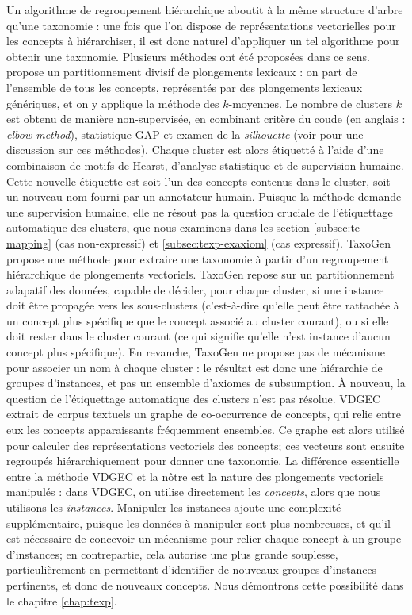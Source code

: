 Un algorithme de regroupement hiérarchique aboutit à la même structure d'arbre qu'une taxonomie : une fois que l'on dispose de représentations vectorielles pour les concepts à hiérarchiser, il est donc naturel d'appliquer un tel algorithme pour obtenir une taxonomie. Plusieurs méthodes ont été proposées dans ce sens. \cite{gupta2016domain} propose un partitionnement divisif de plongements lexicaux : on part de l'ensemble de tous les concepts, représentés par des plongements lexicaux génériques, et on y applique la méthode des $k$-moyennes. Le nombre de clusters $k$ est obtenu de manière non-supervisée, en combinant critère du coude (en anglais : \textit{elbow method}), statistique GAP et examen de la \textit{silhouette} (voir \cite[p.~126--130]{everitt2011cluster} pour une discussion sur ces méthodes). Chaque cluster est alors étiquetté à l'aide d'une combinaison de motifs de Hearst, d'analyse statistique et de supervision humaine. Cette nouvelle étiquette est soit l'un des concepts contenus dans le cluster, soit un nouveau nom fourni par un annotateur humain. Puisque la méthode demande une supervision humaine, elle ne résout pas la question cruciale de l'étiquettage automatique des clusters, que nous examinons dans les section \ref{subsec:te-mapping} (cas non-expressif) et \ref{subsec:texp-exaxiom} (cas expressif). TaxoGen \cite{zhang2018taxogen} propose une méthode pour extraire une taxonomie à partir d'un regroupement hiérarchique de plongements vectoriels. TaxoGen repose sur un partitionnement adapatif des données, capable de décider, pour chaque cluster, si une instance doit être propagée vers les sous-clusters (c'est-à-dire qu'elle peut être rattachée à un concept plus spécifique que le concept associé au cluster courant), ou si elle doit rester dans le cluster courant (ce qui signifie qu'elle n'est instance d'aucun concept plus spécifique). En revanche, TaxoGen ne propose pas de mécanisme pour associer un nom à chaque cluster : le résultat est donc une hiérarchie de groupes d'instances, et pas un ensemble d'axiomes de subsumption. À nouveau, la question de l'étiquettage automatique des clusters n'est pas résolue.
VDGEC \cite{zhang2018variational2} extrait de corpus textuels un graphe de co-occurrence de concepts, qui relie entre eux les concepts apparaissants fréquemment ensembles. Ce graphe est alors utilisé pour calculer des représentations vectoriels des concepts; ces vecteurs sont ensuite regroupés hiérarchiquement pour donner une taxonomie. La différence essentielle entre la méthode VDGEC et la nôtre est la nature des plongements vectoriels manipulés : dans VDGEC, on utilise directement les \textit{concepts}, alors que nous utilisons les \textit{instances}. Manipuler les instances ajoute une complexité supplémentaire, puisque les données à manipuler sont plus nombreuses, et qu'il est nécessaire de concevoir un mécanisme pour relier chaque concept à un groupe d'instances; en contrepartie, cela autorise une plus grande souplesse, particulièrement en permettant d'identifier de nouveaux groupes d'instances pertinents, et donc de nouveaux concepts. Nous démontrons cette possibilité dans le chapitre \ref{chap:texp}.


